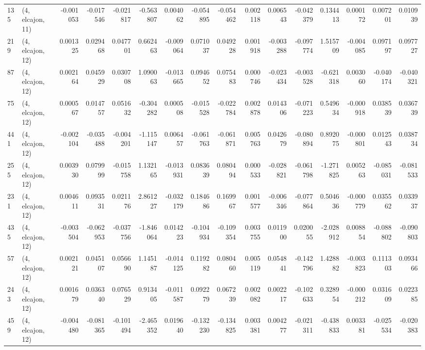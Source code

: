 \begin{tabular}{llrrrrrrrrrrrrrr}
135 &  (4, elcajon, 11) &  -0.001053 & -0.017546 & -0.021817 &   -0.563807 &  0.004062 &  -0.054895 & -0.054462 &  0.002118 &  0.006543 & -0.042379 &    0.134413 &  0.000172 &  0.007201 &  0.010939 \\
219 &  (4, elcajon, 12) &   0.001325 &  0.029468 &  0.047701 &    0.662463 & -0.009064 &   0.071037 &  0.049228 &  0.001918 & -0.003288 & -0.097774 &    1.515709 & -0.004085 &  0.097197 &  0.097727 \\
87  &  (4, elcajon, 12) &   0.002164 &  0.045929 &  0.030708 &    1.090063 & -0.013665 &   0.094652 &  0.075483 &  0.000746 & -0.023434 & -0.003528 &   -0.621318 &  0.003060 & -0.040174 & -0.040321 \\
75  &  (4, elcajon, 12) &   0.000567 &  0.014757 &  0.051632 &   -0.304282 &  0.000508 &  -0.015528 & -0.022784 &  0.002878 &  0.014306 & -0.071223 &    0.549634 & -0.000918 &  0.038539 &  0.036739 \\
441 &  (4, elcajon, 12) &  -0.002104 & -0.035488 & -0.004201 &   -1.115147 &  0.006457 &  -0.061763 & -0.061871 &  0.005763 &  0.042679 & -0.080894 &    0.892075 & -0.000801 &  0.012543 &  0.038734 \\
255 &  (4, elcajon, 12) &   0.003930 &  0.079999 & -0.015758 &    1.132165 & -0.013931 &   0.083639 &  0.080494 &  0.000533 & -0.028821 & -0.061798 &   -1.271825 &  0.005263 & -0.085031 & -0.081533 \\
231 &  (4, elcajon, 12) &   0.004611 &  0.093531 &  0.021176 &    2.861227 & -0.032179 &   0.184686 &  0.169967 &  0.001577 & -0.006346 & -0.077864 &    0.504636 & -0.000779 &  0.035562 &  0.033937 \\
435 &  (4, elcajon, 12) &  -0.003504 & -0.062953 & -0.037756 &   -1.846064 &  0.014223 &  -0.104934 & -0.109354 &  0.003755 &  0.011900 &  0.020055 &   -2.028912 &  0.008854 & -0.088802 & -0.090803 \\
57  &  (4, elcajon, 12) &   0.002121 &  0.045107 &  0.056690 &    1.145187 & -0.014125 &   0.119282 &  0.080460 &  0.005119 &  0.054841 & -0.142796 &    1.428882 & -0.003823 &  0.111303 &  0.093466 \\
243 &  (4, elcajon, 12) &   0.001679 &  0.036340 &  0.076529 &    0.913405 & -0.011587 &   0.092279 &  0.067239 &  0.002082 &  0.002217 & -0.102633 &    0.328954 & -0.000212 &  0.031609 &  0.022385 \\
459 &  (4, elcajon, 12) &  -0.004480 & -0.081365 & -0.101494 &   -2.465352 &  0.019640 &  -0.132230 & -0.134825 &  0.003381 &  0.004277 & -0.021311 &   -0.438833 &  0.003381 & -0.025534 & -0.020383 \\

\end{tabular}
